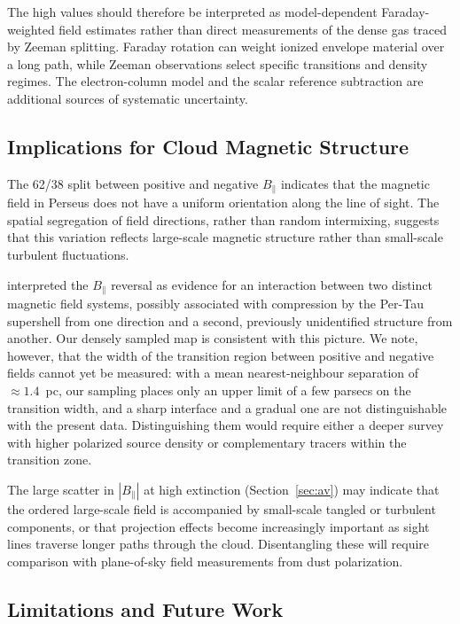 \documentclass[twocolumn]{aastex701}
\begin{document}
The high values should therefore be interpreted as model-dependent
Faraday-weighted field estimates rather than direct measurements of the dense
gas traced by Zeeman splitting. Faraday rotation can weight ionized envelope
material over a long path, while Zeeman observations select specific
transitions and density regimes. The electron-column model and the scalar
reference subtraction are additional sources of systematic uncertainty.

\subsection{Implications for Cloud Magnetic Structure}

The 62/38 split between positive and negative $B_\parallel$ indicates that
the magnetic field in Perseus does not have a uniform orientation along the
line of sight. The spatial segregation of field directions, rather than random
intermixing, suggests that this variation reflects large-scale magnetic
structure rather than small-scale turbulent fluctuations.

\citet{tahani2022b} interpreted the $B_\parallel$ reversal as evidence for an
interaction between two distinct magnetic field systems, possibly associated
with compression by the Per-Tau supershell from one direction and a second,
previously unidentified structure from another. Our densely sampled map is
consistent with this picture. We note, however, that the width of the
transition region between positive and negative fields cannot yet be measured:
with a mean nearest-neighbour separation of $\approx 1.4$~pc, our sampling
places only an upper limit of a few parsecs on the transition width, and a
sharp interface and a gradual one are not distinguishable with the present
data. Distinguishing them would require either a deeper survey with higher
polarized source density or complementary tracers within the transition zone.

The large scatter in $|B_\parallel|$ at high extinction
(Section~\ref{sec:av}) may indicate that the ordered large-scale field is
accompanied by small-scale tangled or turbulent components, or that projection
effects become increasingly important as sight lines traverse longer paths
through the cloud. Disentangling these will require comparison with
plane-of-sky field measurements from dust polarization.

\subsection{Limitations and Future Work}
\end{document}

